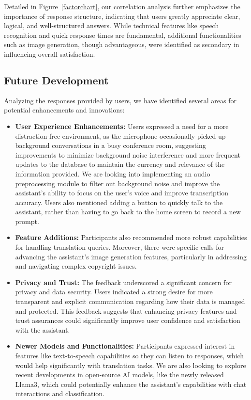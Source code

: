 \documentclass[12pt]{article}
\begin{document}
Detailed in Figure~\ref{factorchart}, our correlation analysis further emphasizes the importance of response structure, indicating that users greatly appreciate clear, logical, and well-structured answers. While technical features like speech recognition and quick response times are fundamental, additional functionalities such as image generation, though advantageous, were identified as secondary in influencing overall satisfaction.

\subsection{Future Development}
Analyzing the responses provided by users, we have identified several areas for potential enhancements and innovations:
\begin{itemize}
	\item \textbf{User Experience Enhancements:} Users expressed a need for a more distraction-free environment, as the microphone occasionally picked up background conversations in a busy conference room, suggesting improvements to minimize background noise interference and more frequent updates to the database to maintain the currency and relevance of the information provided. We are looking into implementing an audio preprocessing module to filter out background noise and improve the assistant's ability to focus on the user's voice and improve transcription accuracy. Users also mentioned adding a button to quickly talk to the assistant, rather than having to go back to the home screen to record a new prompt.
	
	\item \textbf{Feature Additions:} Participants also recommended more robust capabilities for handling translation queries. Moreover, there were specific calls for advancing the assistant's image generation features, particularly in addressing and navigating complex copyright issues.
	
 	\item \textbf{Privacy and Trust:} The feedback underscored a significant concern for privacy and data security. Users indicated a strong desire for more transparent and explicit communication regarding how their data is managed and protected. This feedback suggests that enhancing privacy features and trust assurances could significantly improve user confidence and satisfaction with the assistant. 
 	
	\item \textbf{Newer Models and Functionalities:} Participants expressed interest in features like text-to-speech capabilities so they can listen to responses, which would help significantly with translation tasks. We are also looking to explore recent developments in open-source AI models, like the newly released Llama3, which could potentially enhance the assistant's capabilities with chat interactions and classification.
\end{itemize}
\end{document}
